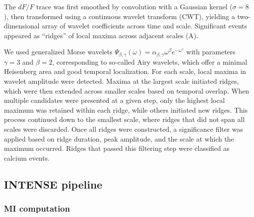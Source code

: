 The $dF/F$ trace was first smoothed by convolution with a Gaussian kernel ($\sigma =
8$), then transformed using a continuous wavelet transform (CWT), yielding a
two-dimensional array of wavelet coefficients across time and scale. Significant
events appeared as ``ridges'' of local maxima across adjacent scales (A).

We used generalized Morse wavelets $\Psi_{\beta,\gamma}(\omega) =
\alpha_{\beta,\gamma}\omega^{\beta}e^{-\omega^{\gamma}}$ with parameters $\gamma =
3$ and $\beta = 2$, corresponding to so-called Airy wavelets, which offer a minimal
Heisenberg area and good temporal localization.
For each scale, local maxima in wavelet amplitude were detected. Maxima at the
largest scale initiated ridges, which were then extended across smaller scales based
on temporal overlap. When multiple candidates were presented at a given step, only
the highest local maximum was retained within each ridge, while others initiated new
ridges. This process continued down to the smallest scale, where ridges that did
not span all scales were discarded.
Once all ridges were constructed, a significance filter was applied based on ridge
duration, peak amplitude, and the scale at which the maximum occurred. Ridges that
passed this filtering step were classified as calcium events.

\subsection{INTENSE pipeline}
\label{sec:intense_pipeline}

\subsubsection{MI computation}
\label{sec:mi_computation}

